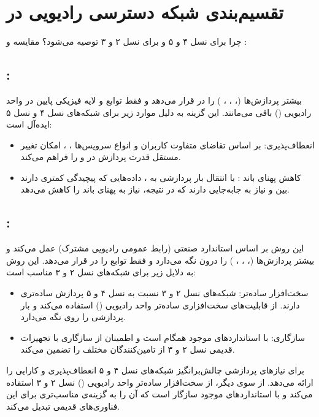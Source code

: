 \documentclass[landscape, 12pt]{report}
\begin{document}
\section*{
تقسیم‌بندی شبکه دسترسی رادیویی 
 در
}
چرا  برای نسل ۴ و ۵ و  برای نسل ۲ و ۳ توصیه می‌شود؟
مقایسه  و :

\subsection*{ :}
بیشتر پردازش‌ها (، ، ، ) را در  قرار می‌دهد و فقط توابع  و لایه فیزیکی پایین در واحد رادیویی () باقی می‌مانند. این گزینه به دلیل موارد زیر برای شبکه‌های نسل ۴ و نسل ۵ ایده‌آل است:
\begin{itemize}
    \item انعطاف‌پذیری: بر اساس تقاضای متفاوت کاربران و انواع سرویس‌ها ، ،  امکان تغییر مستقل قدرت پردازش در  و  را فراهم می‌کند.
    \item کاهش پهنای باند : با انتقال بار پردازشی به ، داده‌هایی که پیچیدگی کمتری دارند بین  و  نیاز به جابه‌جایی دارند که در نتیجه، نیاز به پهنای باند  را کاهش می‌دهد.
\end{itemize}

\subsection*{ :}
این روش بر اساس استاندارد صنعتی  (رابط عمومی رادیویی مشترک) عمل می‌کند و بیشتر پردازش‌ها (، ، ، ) را درون  نگه می‌دارد و فقط توابع  را در  قرار می‌دهد. این روش به دلایل زیر برای شبکه‌های نسل ۲ و ۳ مناسب است:
\begin{itemize}
    \item سخت‌افزار ساده‌تر: شبکه‌های نسل ۲ و ۳ نسبت به نسل ۴ و ۵ پردازش ساده‌تری دارند.  از قابلیت‌های سخت‌افزاری ساده‌تر واحد رادیویی () استفاده می‌کند و بار پردازشی را روی  نگه می‌دارد.
    \item سازگاری:  با استانداردهای موجود  همگام است و اطمینان از سازگاری با تجهیزات قدیمی نسل ۲ و ۳ از تامین‌کنندگان مختلف را تضمین می‌کند.
\end{itemize}

 برای نیازهای پردازشی چالش‌برانگیز شبکه‌های نسل ۴ و ۵ انعطاف‌پذیری و کارایی را ارائه می‌دهد. از سوی دیگر،  از سخت‌افزار ساده‌تر واحد رادیویی () نسل ۲ و ۳ استفاده می‌کند و با استانداردهای موجود سازگار است که آن را به گزینه‌ی مناسب‌تری برای این فناوری‌های قدیمی تبدیل می‌کند.
\end{document}
